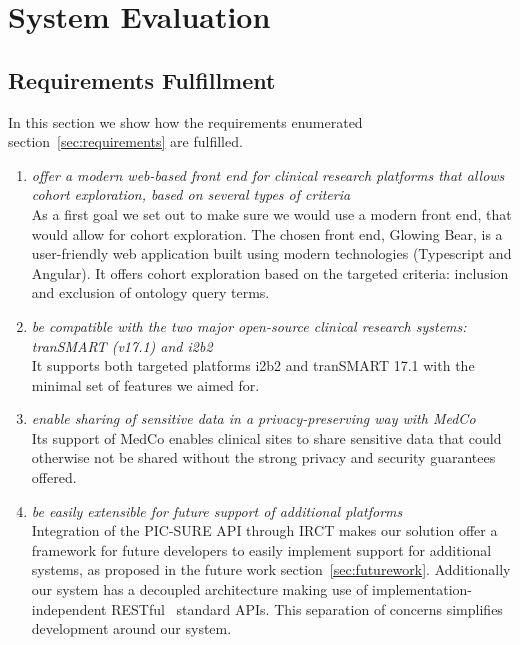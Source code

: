 \chapter{System Evaluation}
\label{sec:evaluation}

\section{Requirements Fulfillment}

In this section we show how the requirements enumerated section~\ref{sec:requirements} are fulfilled.

\begin{enumerate}
    \item \emph{offer a modern web-based front end for clinical research platforms that allows cohort exploration, based on several types of criteria} \\
    As a first goal we set out to make sure we would use a modern front end, that would allow for cohort exploration. The chosen front end, Glowing Bear, is a user-friendly web application built using modern technologies (Typescript and Angular).
    It offers cohort exploration based on the targeted criteria: inclusion and exclusion of ontology query terms.
    
    \item \emph{be compatible with the two major open-source clinical research systems: tranSMART (v17.1) and i2b2} \\
    It supports both targeted platforms i2b2 and tranSMART 17.1 with the minimal set of features we aimed for.

    \item \emph{enable sharing of sensitive data in a privacy-preserving way with MedCo} \\
    Its support of MedCo enables clinical sites to share sensitive data that could otherwise not be shared without the strong privacy and security guarantees offered.

    \item \emph{be easily extensible for future support of additional platforms} \\
    Integration of the PIC-SURE API through IRCT makes our solution offer a framework for future developers to easily implement support for additional systems, as proposed in the future work section~\ref{sec:futurework}.
    Additionally our system has a decoupled architecture making use of implementation-independent RESTful~\cite{rest} standard APIs.
    This separation of concerns simplifies development around our system.


\end{enumerate}
